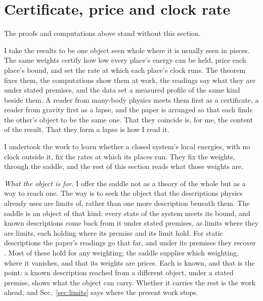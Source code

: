 \documentclass[aps,prd,reprint,superscriptaddress]{revtex4-2}
\begin{document}
\section{Certificate, price and clock rate}
\label{sec:composition}

The proofs and computations above stand without this section.

I take the results to be one object seen whole where it is usually seen in pieces. The same weights certify how low every place's energy can be held, price each place's bound, and set the rate at which each place's clock runs. The theorem fixes them, the computations show them at work, the readings say what they are under stated premises, and the data set a measured profile of the same kind beside them. A reader from many-body physics meets them first as a certificate, a reader from gravity first as a lapse, and the paper is arranged so that each finds the other's object to be the same one. That they coincide is, for me, the content of the result. That they form a lapse is how I read it.

I undertook the work to learn whether a closed system's local energies, with no clock outside it, fix the rates at which its places run. They fix the weights, through the saddle, and the rest of this section reads what those weights are.

\emph{What the object is for.} I offer the saddle not as a theory of the whole but as a way to reach one. The way is to seek the object that the descriptions physics already uses are limits of, rather than one more description beneath them. The saddle is an object of that kind: every state of the system meets its bound, and known descriptions come back from it under stated premises, as limits where they are limits, each holding where its premise and its limit hold. For static descriptions the paper's readings go that far, and under its premises they recover \matchedreadings. Most of these hold for any weighting; the saddle supplies which weighting, where it vanishes, and that its weights are prices. Each is known, and that is the point: a known description reached from a different object, under a stated premise, shows what the object can carry. Whether it carries the rest is the work ahead, and Sec.~\ref{sec:limits} says where the present work stops.
\end{document}
